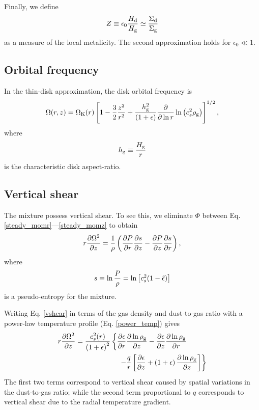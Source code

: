 Finally, we define 
\begin{align}
  Z \equiv \epsilon_0\frac{H_\mathrm{d}}{H_\mathrm{g}} \simeq
  \frac{\Sigma_\mathrm{d}}{\Sigma_\mathrm{g}} 
\end{align}
as a measure of the local metalicity. The second approximation holds
for $\epsilon_0\ll1$. 

\subsection{Orbital frequency} 
In the thin-disk approximation, the disk orbital frequency is 
\begin{align}
  \Omega(r,z) = \Omega_{\rm K}(r)\left[1 - \frac{3}{2}\frac{z^2}{r^2} +
    \frac{h_\mathrm{g}^2}{\left(1+\epsilon\right)}\frac{\partial}{\partial\ln{r}}\ln{\left(c_s^2\rho_\mathrm{g}\right)}
    \right]^{1/2}, 
\end{align}
where 
\begin{align}
  h_\mathrm{g} \equiv \frac{H_\mathrm{g}}{r}
\end{align}
is the characteristic disk aspect-ratio. 

\subsection{Vertical shear}
The mixture possess vertical shear. To see this, we eliminate $\Phi$
between Eq. \ref{steady_momr}---\ref{steady_momz} to 
obtain 
\begin{align}\label{vshear}
  r\frac{\partial \Omega^2}{\partial z} 
   = \frac{1}{\rho}\left(\frac{\partial P}{\partial r}\frac{\partial s}{\partial z} -\frac{\partial
    P}{\partial z}\frac{\partial s}{\partial r} \right),
\end{align}
where
\begin{align}
   s \equiv \ln \frac{P}{\rho} = \ln{\left[c_s^2(1-\tilde{\epsilon})\right]} 
\end{align}
is a pseudo-entropy for the mixture. 

Writing Eq. \ref{vshear} in terms of the gas density and dust-to-gas
ratio with a power-law temperature profile (Eq. \ref{power_temp}) gives 
\begin{align*}
  &r\frac{\p \Omega^2}{\p z}  =
  \frac{c_s^2(r)}{\left(1+\epsilon\right)^2}\left\{
  \frac{\p\epsilon}{\p r}\frac{\p\ln{\rhog}}{\p z}
  -\frac{\p\epsilon}{\p z}\frac{\p\ln{\rhog}}{\p r}\right.\notag\\
  &\phantom{ r\frac{\p \Omega^2}{\p z}  =
    \frac{c_s^2(r)}{\left(1+\epsilon\right)^2}\left\{\right\} }
  \left. -\frac{q}{r}\left[\frac{\p\epsilon}{\p z} + \left(1+\epsilon\right)\frac{\p\ln{\rhog}}{\p z}\right]
  \right\} 
\end{align*}
The first two terms correspond to vertical shear caused by spatial
variations in the dust-to-gas ratio; while the second term
proportional to $q$ corresponds to vertical shear due to the 
radial temperature gradient.

